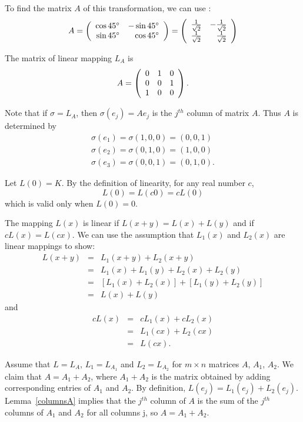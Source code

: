\para To find the matrix $A$ of this transformation, we can use
:
\[ A = \left(\begin{array}{rr} \cos 45^\circ & -\sin 45^\circ\\ \sin 45^\circ &\cos 45^\circ\end{array}\right)
= \left(\begin{array}{rr} \frac{1}{\sqrt{2}} & -\frac{1}{\sqrt{2}}\\ \frac{1}{\sqrt{2}} &\frac{1}{\sqrt{2}}\end{array}\right) \]

\begin{figure}[htb]
                       \centerline{%
                       }
\end{figure}

\ans The matrix of linear mapping $L_A$ is
\[ A = \left(\begin{array}{rrr} 0 & 1 & 0 \\ 0 & 0 & 1 \\ 1 & 0 & 0\end{array}\right). \]

\soln Note that if $\sigma = L_A$, then $\sigma(e_j) = Ae_j$ is the
$j^{th}$ column of matrix $A$.  Thus $A$ is determined by
\[
\begin{array}{l}
\sigma(e_1) = \sigma(1,0,0) = (0,0,1) \\
\sigma(e_2) = \sigma(0,1,0) = (1,0,0) \\
\sigma(e_3) = \sigma(0,0,1) = (0,1,0). \end{array}
\]


Let $L(0) = K$.
By the definition of linearity, for any real number $c$,
\[ L(0) = L(c0) = cL(0) \]
which is valid only when $L(0) = 0$.

The mapping $L(x)$ is linear if $L(x + y) = L(x) + L(y)$ and
if $cL(x) = L(cx)$.  We can use the assumption that $L_1(x)$
and $L_2(x)$ are linear mappings to show:
\[ \begin{array}{rcl}
L(x + y) & = & L_1(x + y) + L_2(x + y) \\
& = & L_1(x) + L_1(y) + L_2(x) + L_2(y) \\
& = & [L_1(x) + L_2(x)] + [L_1(y) + L_2(y)] \\
& = & L(x) + L(y) \end{array} \]
and
\[ \begin{array}{rcl}
cL(x) & = & cL_1(x) + cL_2(x) \\
& = & L_1(cx) + L_2(cx) \\
& = & L(cx). \end{array} \]

Assume that $L = L_A$, $L_1 = L_{A_1}$ and $L_2 = L_{A_2}$ for
$m \times n$ matrices $A$, $A_1$, $A_2$.  We claim that
$A = A_1 + A_2$, where $A_1 + A_2$ is the matrix obtained by
adding corresponding entries of $A_1$ and $A_2$.  By
definition, $L(e_j) = L_1(e_j) + L_2(e_j)$.  Lemma~\ref{columnsA}
implies that the $j^{th}$ column of $A$ is the sum of the
$j^{th}$ columns of $A_1$ and $A_2$ for all columns {j}, so
$A = A_1 + A_2$.

